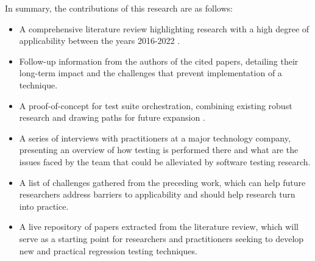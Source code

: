 In summary, the contributions of this research are as follows:
\begin{itemize}
	\item A comprehensive literature review highlighting research with a high degree of applicability between the years 2016-2022 \cite{greca_live_2022}.
	\item Follow-up information from the authors of the cited papers, detailing their long-term impact and the challenges that prevent implementation of a technique.
	\item A proof-of-concept for test suite orchestration, combining existing robust research and drawing paths for future expansion \cite{greca_comparing_2022}.
	\item A series of interviews with practitioners at a major technology company, presenting an overview of how testing is performed there and what are the issues faced by the team that could be alleviated by software testing research.
	\item A list of challenges gathered from the preceding work, which can help future researchers address barriers to applicability and should help research turn into practice.
	\item A live repository of papers extracted from the literature review, which will serve as a starting point for researchers and practitioners seeking to develop new and practical regression testing techniques. 
\end{itemize}


%


